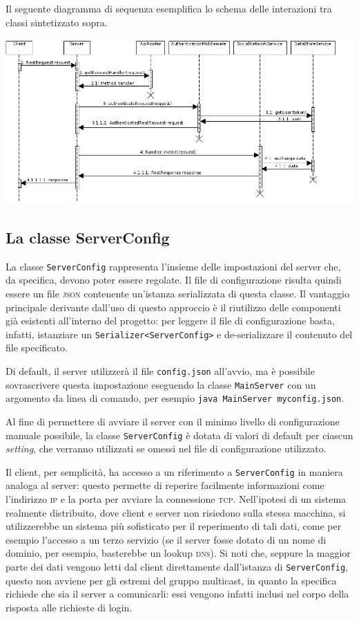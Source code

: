 \documentclass[a4paper,8pt]{article} %
\def\code#1{\texttt{#1}}
\begin{document}
\par Il seguente diagramma di sequenza esemplifica lo schema delle interazioni tra classi sintetizzato sopra.
\par \includegraphics[width=\textwidth]{sequence2.png}

\subsection{La classe ServerConfig}
La classe \code{ServerConfig} rappresenta l'insieme delle impostazioni del server che, da specifica, devono poter essere regolate.
Il file di configurazione risulta quindi essere un file \textsc{json} contenente un'istanza serializzata di questa classe. Il vantaggio principale derivante dall'uso di questo approccio è
il riutilizzo delle componenti già esistenti all'interno del progetto: per leggere il file di configurazione basta, infatti, istanziare un \code{Serializer<ServerConfig>} e de-serializzare il contenuto del file
specificato.
\par Di default, il server utilizzerà il file \code{config.json} all'avvio, ma è possibile sovrascrivere questa impostazione eseguendo la classe \code{MainServer} con un argomento da linea di comando, per esempio
\code{java MainServer myconfig.json}.

\par Al fine di permettere di avviare il server con il minimo livello di configurazione manuale possibile, la classe \code{ServerConfig} è dotata di valori di default per ciascun \emph{setting}, che verranno utilizzati
se omessi nel file di configurazione utilizzato.

\par Il client, per semplicità, ha accesso a un riferimento a \code{ServerConfig} in maniera analoga al server: questo permette di reperire facilmente informazioni come l'indirizzo \textsc{ip} e la porta per avviare la connessione \textsc{tcp}.
Nell'ipotesi di un sistema realmente distribuito, dove client e server non risiedono sulla stessa macchina, si utilizzerebbe un sistema più sofisticato per il reperimento di tali dati, come per esempio l'accesso a un terzo servizio (se
il server fosse dotato di un nome di dominio, per esempio, basterebbe un lookup \textsc{dns}). Si noti che, seppure la maggior parte dei dati vengono letti dal client direttamente dall'istanza di \code{ServerConfig}, questo
non avviene per gli estremi del gruppo multicast, in quanto la specifica richiede che sia il server a comunicarli: essi vengono infatti inclusi nel corpo della risposta alle richieste di login.
\end{document}
